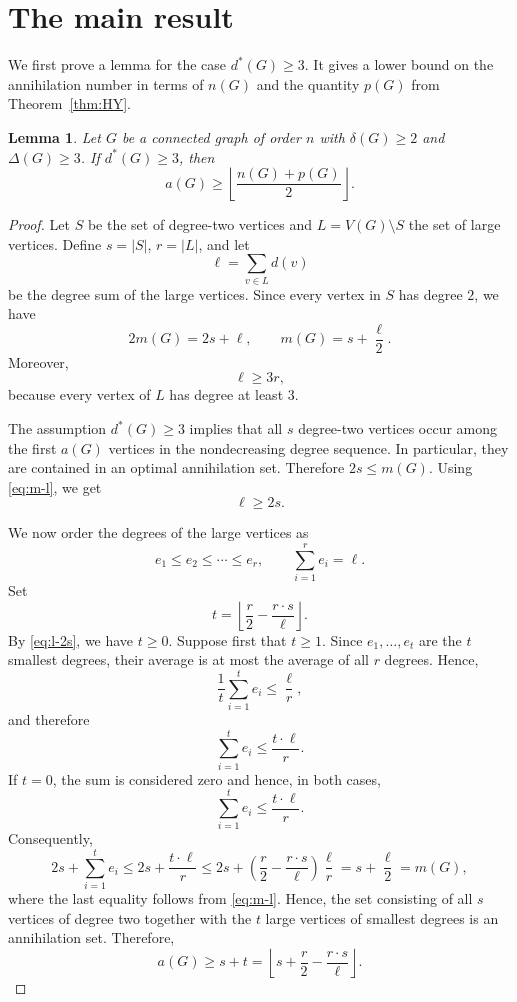\documentclass[12pt]{article}
\newtheorem{lemma}[theorem]{Lemma}
\begin{document}
\section{The main result}\label{sec:main}

We first prove a lemma for the case $d^*(G)\ge3$. It gives a lower bound on the annihilation number in terms of $n(G)$ and the quantity $p(G)$ from Theorem~\ref{thm:HY}.

\begin{lemma}\label{lem:d*3}
Let $G$ be a connected graph of order $n$ with $\delta(G)\ge 2$ and $\Delta(G)\ge 3$. If $d^*(G)\ge3$, then
$$a(G)\ge \left\lfloor\frac{n(G)+p(G)}2\right\rfloor.$$
\end{lemma}

\begin{proof}
Let $S$ be the set of degree-two vertices and $L=V(G)\setminus S$ the set of large vertices. Define $s=|S|$, $r=|L|$, and let
$$\ell=\sum_{v\in L}d(v)$$
be the degree sum of the large vertices. Since every vertex in $S$ has degree $2$, we have
\begin{equation}\label{eq:m-l}
2m(G)=2s+\ell, \qquad m(G)=s+\frac{\ell}{2}.
\end{equation}
Moreover,
\begin{equation}\label{eq:l-3r}
 \ell\ge3r,
\end{equation}
because every vertex of $L$ has degree at least $3$.

The assumption $d^*(G)\ge 3$ implies that all $s$ degree-two vertices occur among the first $a(G)$ vertices in the nondecreasing degree sequence. In particular, they are contained in an optimal annihilation set. Therefore $2s\le m(G)$. Using \eqref{eq:m-l}, we get
\begin{equation}\label{eq:l-2s}
\ell \ge 2s.
\end{equation}

We now order the degrees of the large vertices as
$$e_1\le e_2\le\cdots\le e_r, \qquad \sum_{i=1}^{r}e_i=\ell.$$
Set
$$t=\left\lfloor \frac{r}{2}-\frac{r\cdot s}{\ell}\right\rfloor.$$
By \eqref{eq:l-2s}, we have $t\ge 0$. Suppose first that $t\ge 1$. Since $e_1,\ldots,e_t$ are the $t$ smallest degrees, their average is at most the average of all $r$ degrees. Hence,
$$\frac{1}{t}\sum_{i=1}^{t}e_i\le\frac{\ell}{r},$$
and therefore
$$\sum_{i=1}^{t}e_i\le\frac{t\cdot\ell}{r}.$$
If $t=0$, the sum is considered zero and hence, in both cases,
$$\sum_{i=1}^{t}e_i\le\frac{t\cdot\ell}{r}.$$
Consequently,
$$2s+\sum_{i=1}^{t}e_i \le 2s+\frac{t \cdot \ell}{r} \le 2s+\left(\frac{r}{2}-\frac{r \cdot s}{\ell}\right)\frac{\ell}{r}=s+\frac{\ell}{2}=m(G),$$
where the last equality follows from \eqref{eq:m-l}. Hence, the set consisting of all $s$ vertices of degree two together with the $t$ large vertices of smallest degrees is an annihilation set. Therefore,
\begin{equation}\label{eq:a-st}
a(G)\ge s+t =\left\lfloor s+\frac r2-\frac{r \cdot s}{\ell}\right\rfloor.
\end{equation}


\end{proof}
\end{document}
